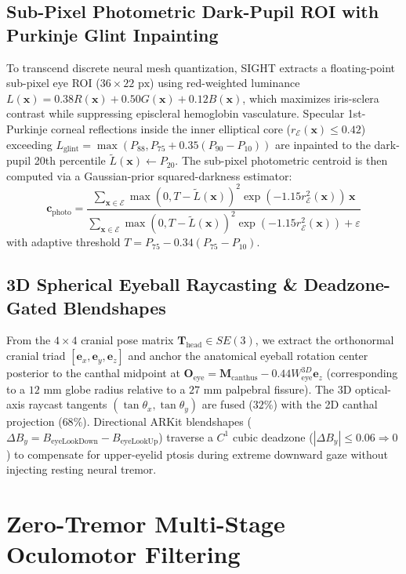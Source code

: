 \documentclass[twocolumn,10pt]{article}
\begin{document}
\subsection{Sub-Pixel Photometric Dark-Pupil ROI with Purkinje Glint Inpainting}
To transcend discrete neural mesh quantization, SIGHT extracts a floating-point sub-pixel eye ROI ($36 \times 22\text{ px}$) using red-weighted luminance $L(\mathbf{x}) = 0.38 R(\mathbf{x}) + 0.50 G(\mathbf{x}) + 0.12 B(\mathbf{x})$, which maximizes iris-sclera contrast while suppressing episcleral hemoglobin vasculature. Specular 1st-Purkinje corneal reflections inside the inner elliptical core ($r_{\mathcal{E}}(\mathbf{x}) \le 0.42$) exceeding $L_{\text{glint}} = \max(P_{88}, P_{75} + 0.35(P_{90} - P_{10}))$ are inpainted to the dark-pupil 20th percentile $\tilde{L}(\mathbf{x}) \leftarrow P_{20}$. The sub-pixel photometric centroid is then computed via a Gaussian-prior squared-darkness estimator:
\begin{equation}
\mathbf{c}_{\text{photo}} = \frac{\sum_{\mathbf{x} \in \mathcal{E}} \max(0, T - \tilde{L}(\mathbf{x}))^2 \exp(-1.15 r_{\mathcal{E}}^2(\mathbf{x}))\,\mathbf{x}}{\sum_{\mathbf{x} \in \mathcal{E}} \max(0, T - \tilde{L}(\mathbf{x}))^2 \exp(-1.15 r_{\mathcal{E}}^2(\mathbf{x})) + \varepsilon}
\end{equation}
with adaptive threshold $T = P_{75} - 0.34(P_{75} - P_{10})$.

\subsection{3D Spherical Eyeball Raycasting \& Deadzone-Gated Blendshapes}
From the $4 \times 4$ cranial pose matrix $\mathbf{T}_{\text{head}} \in SE(3)$, we extract the orthonormal cranial triad $[\mathbf{e}_x, \mathbf{e}_y, \mathbf{e}_z]$ and anchor the anatomical eyeball rotation center posterior to the canthal midpoint at $\mathbf{O}_{\text{eye}} = \mathbf{M}_{\text{canthus}} - 0.44 W_{\text{eye}}^{3D} \mathbf{e}_z$ (corresponding to a $12\text{ mm}$ globe radius relative to a $27\text{ mm}$ palpebral fissure). The 3D optical-axis raycast tangents $(\tan\theta_x, \tan\theta_y)$ are fused ($32\%$) with the 2D canthal projection ($68\%$). Directional ARKit blendshapes ($\Delta B_y = B_{\text{eyeLookDown}} - B_{\text{eyeLookUp}}$) traverse a $C^1$ cubic deadzone ($|\Delta B_y| \le 0.06 \Rightarrow 0$) to compensate for upper-eyelid ptosis during extreme downward gaze without injecting resting neural tremor.

\section{Zero-Tremor Multi-Stage Oculomotor Filtering}
\label{sec:filtering}
\end{document}
